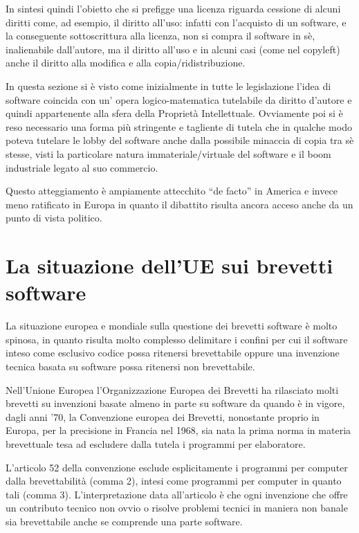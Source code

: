 In sintesi quindi l'obietto che si prefigge una licenza riguarda cessione di alcuni diritti come, ad esempio, il diritto all'uso: infatti con l'acquisto di un software, e la conseguente sottoscrittura alla licenza, non si compra il software in sè, inalienabile dall'autore, ma il diritto all'uso e in alcuni casi (come nel copyleft) anche il diritto alla modifica e alla copia/ridistribuzione.

In questa sezione si è visto come inizialmente in tutte le legislazione l'idea di software coincida con un' opera logico-matematica tutelabile da diritto d'autore e quindi appartenente alla sfera della Proprietà Intellettuale. Ovviamente poi si è reso necessario una forma più stringente e tagliente di tutela che in qualche modo poteva tutelare le lobby del software anche dalla possibile minaccia di copia tra sè stesse, visti la particolare natura immateriale/virtuale del software e il boom industriale legato al suo commercio.

Questo atteggiamento è ampiamente attecchito ``de facto'' in America e invece meno ratificato in Europa in quanto il dibattito risulta ancora acceso anche da un punto di vista politico.

\section{La situazione dell'UE sui brevetti software}
La situazione europea e mondiale sulla questione dei brevetti software è molto spinosa, in quanto risulta molto complesso delimitare i confini per cui il software inteso come esclusivo codice possa ritenersi brevettabile oppure una invenzione tecnica basata su software possa ritenersi non brevettabile.

Nell'Unione Europea l'Organizzazione Europea dei Brevetti ha rilasciato molti brevetti su invenzioni basate almeno in parte su software da quando è in vigore, dagli anni '70, la Convenzione europea dei Brevetti, nonostante proprio in Europa, per la precisione in Francia nel 1968\cite{invenzione-software}, sia nata la prima norma in materia brevettuale tesa ad escludere dalla tutela i programmi per elaboratore.

L'articolo 52  della convenzione esclude esplicitamente i programmi per computer dalla brevettabilità (comma 2), intesi come programmi per computer in quanto tali (comma 3). L'interpretazione data all'articolo è che ogni invenzione che offre un contributo tecnico non ovvio o risolve problemi tecnici in maniera non banale sia brevettabile anche se comprende una parte software.

